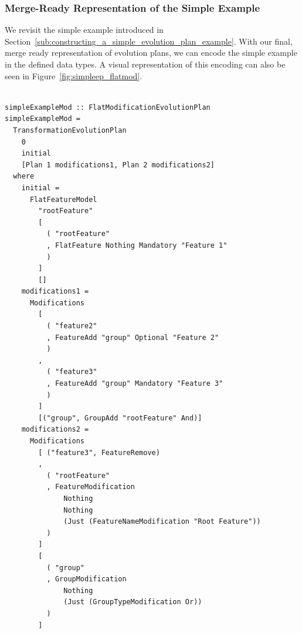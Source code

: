 \documentclass[a4paper,english]{ifimaster}
\begin{document}
\subsubsection{Merge-Ready Representation of the Simple Example}%
\label{ssub:merge_ready_representation_of_the_simple_example}

We revisit the simple example introduced in Section~\vref{sub:constructing_a_simple_evolution_plan_example}. With our final, merge ready representation of evolution plans, we can encode the simple example in the defined data types. A visual representation of this encoding can also be seen in Figure~\vref{fig:simpleep_flatmod}.

\begin{verbatim}

simpleExampleMod :: FlatModificationEvolutionPlan
simpleExampleMod =
  TransformationEvolutionPlan
    0
    initial
    [Plan 1 modifications1, Plan 2 modifications2]
  where
    initial =
      FlatFeatureModel
        "rootFeature"
        [
          ( "rootFeature"
          , FlatFeature Nothing Mandatory "Feature 1"
          )
        ]
        []
    modifications1 =
      Modifications
        [
          ( "feature2"
          , FeatureAdd "group" Optional "Feature 2"
          )
        ,
          ( "feature3"
          , FeatureAdd "group" Mandatory "Feature 3"
          )
        ]
        [("group", GroupAdd "rootFeature" And)]
    modifications2 =
      Modifications
        [ ("feature3", FeatureRemove)
        ,
          ( "rootFeature"
          , FeatureModification
              Nothing
              Nothing
              (Just (FeatureNameModification "Root Feature"))
          )
        ]
        [
          ( "group"
          , GroupModification
              Nothing
              (Just (GroupTypeModification Or))
          )
        ]
\end{verbatim}
\end{document}

